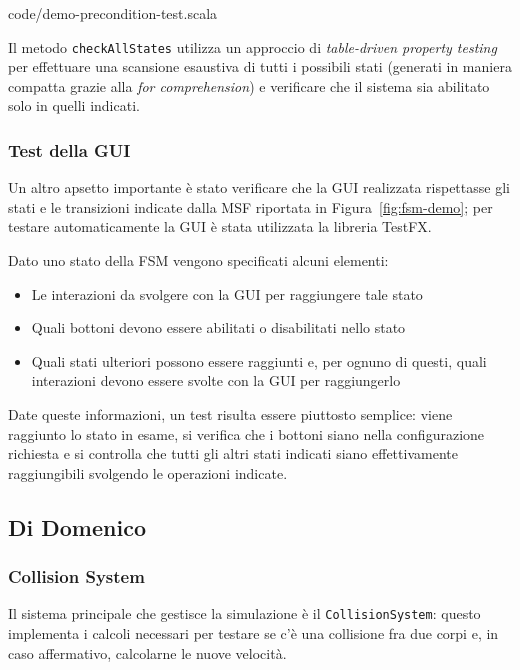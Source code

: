 
{code/demo-precondition-test.scala}

Il metodo \texttt{checkAllStates} utilizza un approccio di \textit{table-driven property testing} per effettuare
una scansione esaustiva di tutti i possibili stati (generati in maniera compatta grazie alla \textit{for comprehension})
e verificare che il sistema sia abilitato solo in quelli indicati.

\subsubsection{Test della GUI}
Un altro apsetto importante è stato verificare che la GUI realizzata rispettasse gli stati e le transizioni indicate
dalla MSF riportata in Figura~\ref{fig:fsm-demo};
per testare automaticamente la GUI è stata utilizzata la libreria TestFX\cite{testfx}.

Dato uno stato della FSM vengono specificati alcuni elementi:
\begin{itemize}
    \item Le interazioni da svolgere con la GUI per raggiungere tale stato
    \item Quali bottoni devono essere abilitati o disabilitati nello stato
    \item Quali stati ulteriori possono essere raggiunti e, per ognuno di questi, quali interazioni
          devono essere svolte con la GUI per raggiungerlo
\end{itemize}
Date queste informazioni, un test risulta essere piuttosto semplice: viene raggiunto lo stato in esame, si verifica che
i bottoni siano nella configurazione richiesta e si controlla che tutti gli altri stati indicati siano effettivamente
raggiungibili svolgendo le operazioni indicate.

\subsection{Di Domenico}\label{subsec:demo-di-domenico}

\subsubsection{Collision System}\label{subsec:container}
Il sistema principale che gestisce la simulazione è il \texttt{CollisionSystem}: questo implementa i calcoli necessari
per testare se c'è una collisione fra due corpi e, in caso affermativo, calcolarne le nuove velocità.

